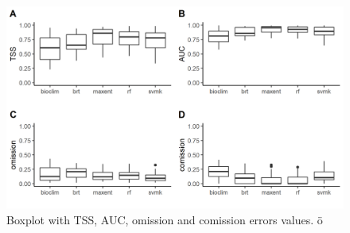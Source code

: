 \begin{figure}
 \centering
 \includegraphics[width=90 mm]{figs/boxplot_tss_auc_OK.png} 
 \caption{Boxplot with TSS, AUC, omission and comission errors values. ö}
  \label{boxplot}
\end{figure}

